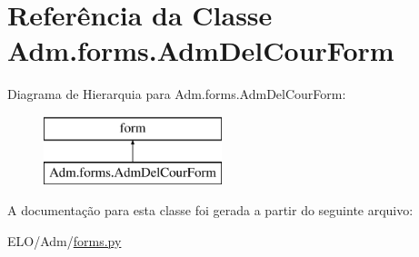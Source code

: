 \hypertarget{classAdm_1_1forms_1_1AdmDelCourForm}{\section{Referência da Classe Adm.\-forms.\-Adm\-Del\-Cour\-Form}
\label{classAdm_1_1forms_1_1AdmDelCourForm}
}
Diagrama de Hierarquia para Adm.\-forms.\-Adm\-Del\-Cour\-Form\-:\begin{figure}[H]
\begin{center}
\leavevmode
\includegraphics[height=2.000000cm]{da/d13/classAdm_1_1forms_1_1AdmDelCourForm}
\end{center}
\end{figure}


A documentação para esta classe foi gerada a partir do seguinte arquivo\-:\begin{DoxyCompactItemize}
\item 
E\-L\-O/\-Adm/\hyperlink{Adm_2forms_8py}{forms.\-py}\end{DoxyCompactItemize}
